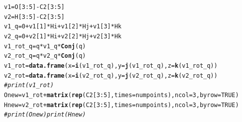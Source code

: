 \documentclass{article}\usepackage[]{graphicx}\usepackage[]{color}
\makeatletter
\newcommand{\hlnum}[1]{\textcolor[rgb]{0.686,0.059,0.569}{#1}}%
\newcommand{\hlcom}[1]{\textcolor[rgb]{0.678,0.584,0.686}{\textit{#1}}}%
\newcommand{\hlopt}[1]{\textcolor[rgb]{0,0,0}{#1}}%
\newcommand{\hlstd}[1]{\textcolor[rgb]{0.345,0.345,0.345}{#1}}%
\newcommand{\hlkwb}[1]{\textcolor[rgb]{0.69,0.353,0.396}{#1}}%
\newcommand{\hlkwc}[1]{\textcolor[rgb]{0.333,0.667,0.333}{#1}}%
\newcommand{\hlkwd}[1]{\textcolor[rgb]{0.737,0.353,0.396}{\textbf{#1}}}%
\newenvironment{kframe}{%
 \def\at@end@of@kframe{}%
 \ifinner\ifhmode%
  \def\at@end@of@kframe{\end{minipage}}%
  \begin{minipage}{\columnwidth}%
 \fi\fi%
 \def\FrameCommand##1{\hskip\@totalleftmargin \hskip-\fboxsep
 \colorbox{shadecolor}{##1}\hskip-\fboxsep
     \hskip-\linewidth \hskip-\@totalleftmargin \hskip\columnwidth}%
 \MakeFramed {\advance\hsize-\width
   \@totalleftmargin\z@ \linewidth\hsize
   \@setminipage}}%
 {\par\unskip\endMakeFramed%
 \at@end@of@kframe}
\newenvironment{knitrout}{}{} %
\makeatother
\begin{document}
\begin{knitrout}
\color{fgcolor}\begin{kframe}
\begin{alltt}
\hlstd{v1} \hlkwb{=} \hlstd{O[}\hlnum{3}\hlopt{:}\hlnum{5}\hlstd{]} \hlopt{-} \hlstd{C2[}\hlnum{3}\hlopt{:}\hlnum{5}\hlstd{]}
\hlstd{v2} \hlkwb{=} \hlstd{H[}\hlnum{3}\hlopt{:}\hlnum{5}\hlstd{]} \hlopt{-} \hlstd{C2[}\hlnum{3}\hlopt{:}\hlnum{5}\hlstd{]}
\hlstd{v1_q} \hlkwb{=} \hlnum{0} \hlopt{+} \hlstd{v1[}\hlnum{1}\hlstd{]} \hlopt{*} \hlstd{Hi} \hlopt{+} \hlstd{v1[}\hlnum{2}\hlstd{]} \hlopt{*} \hlstd{Hj} \hlopt{+} \hlstd{v1[}\hlnum{3}\hlstd{]} \hlopt{*} \hlstd{Hk}
\hlstd{v2_q} \hlkwb{=} \hlnum{0} \hlopt{+} \hlstd{v2[}\hlnum{1}\hlstd{]} \hlopt{*} \hlstd{Hi} \hlopt{+} \hlstd{v2[}\hlnum{2}\hlstd{]} \hlopt{*} \hlstd{Hj} \hlopt{+} \hlstd{v2[}\hlnum{3}\hlstd{]} \hlopt{*} \hlstd{Hk}
\hlstd{v1_rot_q} \hlkwb{=} \hlstd{q} \hlopt{*} \hlstd{v1_q} \hlopt{*} \hlkwd{Conj}\hlstd{(q)}
\hlstd{v2_rot_q} \hlkwb{=} \hlstd{q} \hlopt{*} \hlstd{v2_q} \hlopt{*} \hlkwd{Conj}\hlstd{(q)}
\hlstd{v1_rot} \hlkwb{=} \hlkwd{data.frame}\hlstd{(}\hlkwc{x} \hlstd{=} \hlkwd{i}\hlstd{(v1_rot_q),} \hlkwc{y} \hlstd{=} \hlkwd{j}\hlstd{(v1_rot_q),} \hlkwc{z} \hlstd{=} \hlkwd{k}\hlstd{(v1_rot_q))}
\hlstd{v2_rot} \hlkwb{=} \hlkwd{data.frame}\hlstd{(}\hlkwc{x} \hlstd{=} \hlkwd{i}\hlstd{(v2_rot_q),} \hlkwc{y} \hlstd{=} \hlkwd{j}\hlstd{(v2_rot_q),} \hlkwc{z} \hlstd{=} \hlkwd{k}\hlstd{(v2_rot_q))}
\hlcom{# print(v1_rot)}
\hlstd{Onew} \hlkwb{=} \hlstd{v1_rot} \hlopt{+} \hlkwd{matrix}\hlstd{(}\hlkwd{rep}\hlstd{(C2[}\hlnum{3}\hlopt{:}\hlnum{5}\hlstd{],} \hlkwc{times} \hlstd{= numpoints),} \hlkwc{ncol} \hlstd{=} \hlnum{3}\hlstd{,} \hlkwc{byrow} \hlstd{=} \hlnum{TRUE}\hlstd{)}
\hlstd{Hnew} \hlkwb{=} \hlstd{v2_rot} \hlopt{+} \hlkwd{matrix}\hlstd{(}\hlkwd{rep}\hlstd{(C2[}\hlnum{3}\hlopt{:}\hlnum{5}\hlstd{],} \hlkwc{times} \hlstd{= numpoints),} \hlkwc{ncol} \hlstd{=} \hlnum{3}\hlstd{,} \hlkwc{byrow} \hlstd{=} \hlnum{TRUE}\hlstd{)}
\hlcom{# print(Onew) print(Hnew)}
\end{alltt}
\end{kframe}
\end{knitrout}
\end{document}

